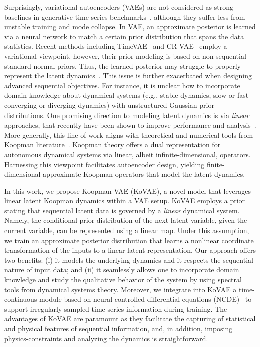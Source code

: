 \documentclass{article} %
\begin{document}
Surprisingly, variational autoencoders (VAEs) are not considered as strong baselines in generative time series benchmarks~\citep{ang2023tsgbench}, although they suffer less from unstable training and mode collapse.
In VAE, an approximate posterior is learned via a neural network to match a certain prior distribution that spans the data statistics.
Recent methods including TimeVAE~\citep{desai2021timevae} and CR-VAE~\citep{li2023causal} employ a variational viewpoint, however, their prior modeling is based on non-sequential standard normal priors. 
Thus, the learned posterior may struggle to properly represent the latent dynamics~\citep{girin2021dynamical}. This issue is further exacerbated when designing advanced sequential objectives. 
For instance, it is unclear how to incorporate domain knowledge about dynamical systems (e.g., stable dynamics, slow or fast converging or diverging dynamics) with unstructured Gaussian prior distributions.
One promising direction to modeling latent dynamics is via \emph{linear} approaches, that recently have been shown to improve performance and analysis~\citep{zeng2023transformers,orvieto2023resurrecting}. 
More generally, this line of work aligns with theoretical and numerical tools from Koopman literature~\citep{koopman1931hamiltonian, rowley2009spectral, takeishi2017learning}. Koopman theory offers a dual representation for autonomous dynamical systems via linear, albeit infinite-dimensional, operators. Harnessing this viewpoint facilitates autoencoder design, yielding finite-dimensional approximate Koopman operators that model the latent dynamics.

In this work, we propose Koopman VAE (KoVAE), a novel model that leverages linear latent Koopman dynamics within a VAE setup. 
KoVAE employs a prior stating that sequential latent data is governed by a \emph{linear} dynamical system.
%
Namely, the conditional prior distribution of the next latent variable, given the current variable, can be represented using a linear map.
%
Under this assumption, we train an approximate posterior distribution that learns a nonlinear coordinate transformation of the inputs to a linear latent representation.
%
Our approach offers two benefits: 
(i) it models the underlying dynamics and it respects the sequential nature of input data; and
(ii) it seamlessly allows one to incorporate domain knowledge and study the qualitative behavior of the system by using spectral tools from dynamical systems theory. 
%
Moreover, we integrate into KoVAE a time-continuous module based on neural controlled differential equations (NCDE)~\citep{kidger2020neural} to support irregularly-sampled time series information during training.
%
The advantages of KoVAE are paramount as they facilitate the capturing of statistical and physical features of sequential information, and, in addition, imposing physics-constraints and analyzing the dynamics is straightforward.
\end{document}
